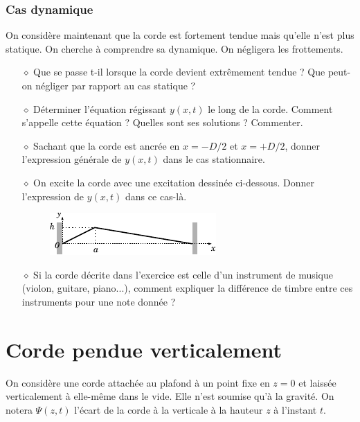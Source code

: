 \documentclass{report}
\begin{document}
\subsubsection*{Cas dynamique}

On considère maintenant que la corde est fortement tendue mais qu'elle n'est plus statique. On cherche à comprendre sa dynamique. On négligera les frottements.

\begin{itemize}

	\item[$\diamond$] Que se passe t-il lorsque la corde devient extrêmement tendue ? Que peut-on négliger par rapport au cas statique ?

	\item[$\diamond$] Déterminer l'équation régissant $y(x,t)$ le long de la corde. Comment s'appelle cette équation ? Quelles sont ses solutions ? Commenter.
	
	\item[$\diamond$] Sachant que la corde est ancrée en $x=-D/2$ et $x=+D/2$, donner l'expression générale de $y(x,t)$ dans le cas stationnaire. 
	
	\item[$\diamond$] On excite la corde avec une excitation dessinée ci-dessous. Donner l'expression de $y(x,t)$ dans ce cas-là.
	
	\begin{figure}[h!]
	\centering
		\includegraphics[scale=1.5]{onde2.pdf}
	\end{figure}

	\item[$\diamond$] Si la corde décrite dans l'exercice est celle d'un instrument de musique (violon, guitare, piano...), comment expliquer la différence de timbre entre ces instruments pour une note donnée ?
	
\end{itemize}

\newpage

\section*{Corde pendue verticalement}

On considère une corde attachée au plafond à un point fixe en $z=0$ et laissée verticalement à elle-même dans le vide. Elle n'est soumise qu'à la gravité. On notera $\Psi(z,t)$ l'écart de la corde à la verticale à la hauteur $z$ à l'instant $t$.
\end{document}
